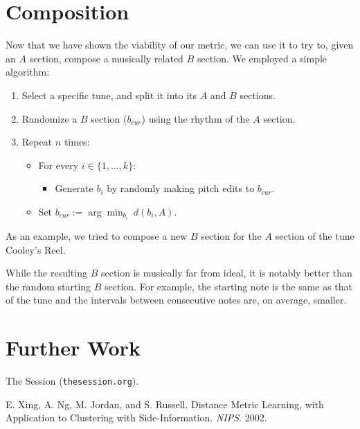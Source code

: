 \documentclass{article} %
\begin{document}
\section{Composition}
Now that we have shown the viability of our metric, we can use it to try to,
given an $A$ section, compose a musically related $B$ section. We employed a
simple algorithm:
\begin{enumerate}
\item Select a specific tune, and split it into its $A$ and $B$ sections.

\item Randomize a $B$ section ($b_{cur}$) using the rhythm of the $A$ section.

\item Repeat $n$ times:
\begin{itemize}\parskip=0.05in
\item[] For every $i \in \{1, \dots, k\}$:
\begin{itemize}
\item[] Generate $b_i$ by randomly making pitch edits to $b_{cur}$.
\end{itemize}
\item[] Set
$\displaystyle{b_{cur} := \arg \min_{b_i} \  d(b_i, A)}$.
\end{itemize}
\end{enumerate}
As an example, we tried to compose a new $B$ section for the $A$ section of the
tune Cooley's Reel. %

While the resulting $B$ section is musically far from ideal, it is notably
better than the random starting $B$ section. For example, the starting note is
the same as that of the tune and the intervals between consecutive notes are, on
average, smaller.

\section{Further Work}



\begin{thebibliography}{9}

The Session (\texttt{thesession.org}).

E. Xing, A. Ng, M. Jordan, and S. Russell. Distance Metric Learning, with
Application to Clustering with Side-Information. \textit{NIPS}. 2002.

%
%
%
%
\end{thebibliography}
\end{document}
